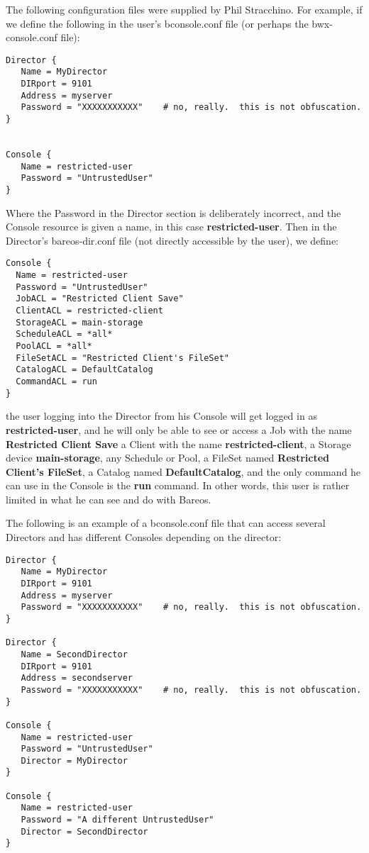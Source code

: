 The following configuration files were supplied by Phil Stracchino. For
example, if we define the following in the user's bconsole.conf file (or
perhaps the bwx-console.conf file):

\footnotesize
\begin{verbatim}
Director {
   Name = MyDirector
   DIRport = 9101
   Address = myserver
   Password = "XXXXXXXXXXX"    # no, really.  this is not obfuscation.
}


Console {
   Name = restricted-user
   Password = "UntrustedUser"
}
\end{verbatim}
\normalsize

Where the Password in the Director section is deliberately incorrect, and the
Console resource is given a name, in this case {\bf restricted-user}. Then
in the Director's bareos-dir.conf file (not directly accessible by the user),
we define:

\footnotesize
\begin{verbatim}
Console {
  Name = restricted-user
  Password = "UntrustedUser"
  JobACL = "Restricted Client Save"
  ClientACL = restricted-client
  StorageACL = main-storage
  ScheduleACL = *all*
  PoolACL = *all*
  FileSetACL = "Restricted Client's FileSet"
  CatalogACL = DefaultCatalog
  CommandACL = run
}
\end{verbatim}
\normalsize

the user logging into the Director from his Console will get logged in as {\bf
restricted-user}, and he will only be able to see or access a Job with the
name {\bf Restricted Client Save} a Client with the name {\bf
restricted-client}, a Storage device {\bf main-storage}, any Schedule or Pool,
a FileSet named {\bf Restricted Client's FileSet}, a Catalog named {\bf
DefaultCatalog}, and the only command he can use in the Console is the {\bf
run} command. In other words, this user is rather limited in what he can see
and do with Bareos.

The following is an example of a bconsole.conf file that can access
several Directors and has different Consoles depending on the director:

\footnotesize
\begin{verbatim}
Director {
   Name = MyDirector
   DIRport = 9101
   Address = myserver
   Password = "XXXXXXXXXXX"    # no, really.  this is not obfuscation.
}

Director {
   Name = SecondDirector
   DIRport = 9101
   Address = secondserver
   Password = "XXXXXXXXXXX"    # no, really.  this is not obfuscation.
}

Console {
   Name = restricted-user
   Password = "UntrustedUser"
   Director = MyDirector
}

Console {
   Name = restricted-user
   Password = "A different UntrustedUser"
   Director = SecondDirector
}
\end{verbatim}
\normalsize


